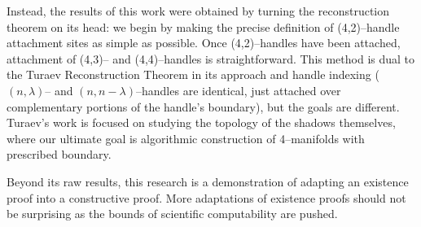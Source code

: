 Instead, the results of this work were obtained by turning the reconstruction theorem on its head: we begin by making the precise definition of (4,2)--handle attachment sites as simple as possible.
Once (4,2)--handles have been attached, attachment of (4,3)-- and (4,4)--handles is straightforward.
This method is dual to the Turaev Reconstruction Theorem in its approach and handle indexing ($(n,\lambda)$-- and $(n,n-\lambda)$--handles are identical, just attached over complementary portions of the handle's boundary), but the goals are different.
Turaev's work is focused on studying the topology of the shadows themselves, where our ultimate goal is algorithmic construction of 4--manifolds with prescribed boundary.

Beyond its raw results, this research is a demonstration of adapting an existence proof into a constructive proof.
More adaptations of existence proofs should not be surprising as the bounds of scientific computability are pushed.
